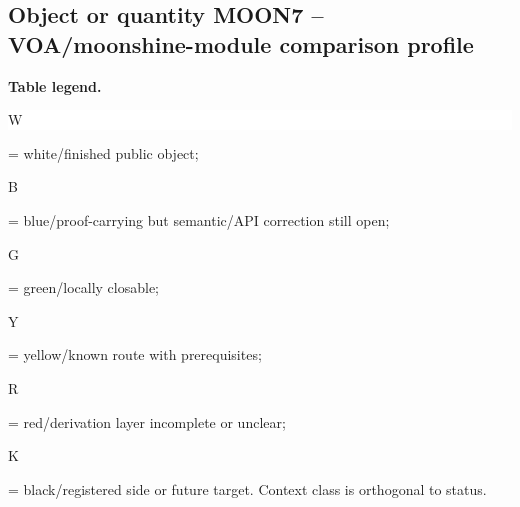 \subsection*{Object or quantity MOON7 -- VOA/\allowbreak{}moonshine-module comparison profile}
\hypertarget{objproof:MOON7}{}
\par\smallskip\noindent\begin{minipage}{0.99\linewidth}\footnotesize\raggedright\textbf{Table legend.} \colorbox{white}{\strut W} = white/finished public object; \colorbox{cyan!20}{\strut B} = blue/proof-carrying but semantic/API correction still open; \colorbox{green!18}{\strut G} = green/locally closable; \colorbox{yellow!25}{\strut Y} = yellow/known route with prerequisites; \colorbox{red!20}{\strut R} = red/derivation layer incomplete or unclear; \colorbox{black!18}{\strut K} = black/registered side or future target. Context class is orthogonal to status.\end{minipage}\par\vspace{0.25em}
